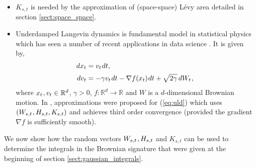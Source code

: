 \documentclass[sn-mathphys-num]{sn-jnl}%
\newcommand{\R}{\mathbb{R}}
\newcommand{\m}{\hspace{0.25mm}}
\begin{document}
\begin{itemize}
\item $K_{s,t}$ is needed by the approximation of (space-space) L\'{e}vy area detailed in section \ref{sect:space_space}.\medbreak
\item Underdamped Langevin dynamics is fundamental model in statistical physics \cite{leimkuhler2015langevin} which has seen a number of recent applications in data science \cite{chen2014sghmc, cheng2018uld, nemeth2021mcmc, chada2024uld}. It is given by,
\begin{align}\label{eq:uld}
dx_t & = v_t\m dt,\\[1pt]
dv_t & = -\gamma v_t\m dt -\nabla f(x_t)\m dt + \sqrt{2\gamma}\, dW_t\m,\nonumber
\end{align}
where $x_t\m, v_t\in\R^d$, $\gamma > 0$, $f : \R^d\rightarrow \R$ and $W$ is a $d$-dimensional Brownian motion.
In \cite{foster2021uld, scott2025uld}, approximations were proposed for (\ref{eq:uld}) which uses $(W_{s,t}\m, H_{s,t}, K_{s,t})$ and achieves third order convergence (provided the gradient $\nabla f$ is sufficiently smooth).
\end{itemize}

We now show how the random vectors $W_{s,t}\m, H_{s,t}$ and $K_{s,t}$ can be used to determine the integrals in the Brownian signature that were given at the beginning of section \ref{sect:gaussian_integrals}.\medbreak
\end{document}
